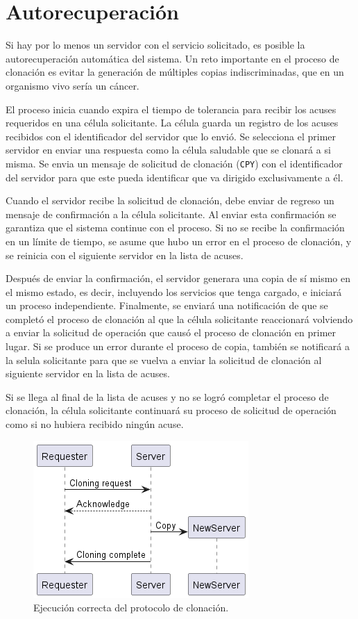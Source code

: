 \documentclass[conference,compsoc]{IEEEtran}
\begin{document}
\section{Autorecuperación}\label{sec:recov}

Si hay por lo menos un servidor con el servicio solicitado, es posible la autorecuperación automática del sistema. Un reto importante en el proceso de clonación es evitar la generación de múltiples copias indiscriminadas, que en un organismo vivo sería un cáncer.

El proceso inicia cuando expira el tiempo de tolerancia para recibir los acuses requeridos en una célula solicitante. La célula guarda un registro de los acuses recibidos con el identificador del servidor que lo envió. Se selecciona el primer servidor en enviar una respuesta como la célula saludable que se clonará a si misma. Se envia un mensaje de solicitud de clonación (\texttt{CPY}) con el identificador del servidor para que este pueda identificar que va dirigido exclusivamente a él.

Cuando el servidor recibe la solicitud de clonación, debe enviar de regreso un mensaje de confirmación a la célula solicitante. Al enviar esta confirmación se garantiza que el sistema continue con el proceso. Si no se recibe la confirmación en un límite de tiempo, se asume que hubo un error en el proceso de clonación, y se reinicia con el siguiente servidor en la lista de acuses.

Después de enviar la confirmación, el servidor generara una copia de sí mismo en el mismo estado, es decir, incluyendo los servicios que tenga cargado, e iniciará un proceso independiente. Finalmente, se enviará una notificación de que se completó el proceso de clonación al que la célula solicitante reaccionará volviendo a enviar la solicitud de operación que causó el proceso de clonación en primer lugar. Si se produce un error durante el proceso de copia, también se notificará a la selula solicitante para que se vuelva a enviar la solicitud de clonación al siguiente servidor en la lista de acuses.

Si se llega al final de la lista de acuses y no se logró completar el proceso de clonación, la célula solicitante continuará su proceso de solicitud de operación como si no hubiera recibido ningún acuse.

\begin{figure}[hbt]
    \centering
    \includegraphics[width=0.7\columnwidth]{cloning.png}
    \caption{Ejecución correcta del protocolo de clonación.}
    \label{fig:cloning}
\end{figure}
\end{document}
